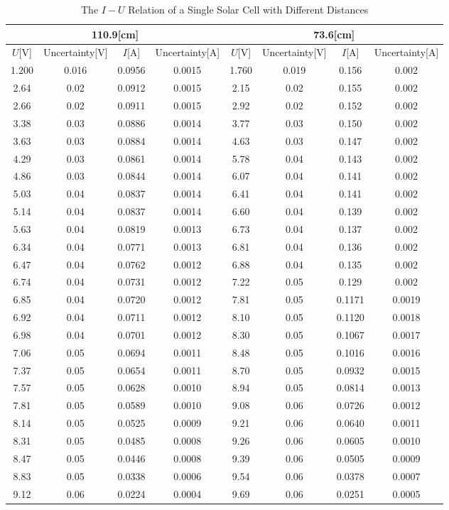 \documentclass[a4paper]{article}
\begin{document}
    \begin{table}[H]
        \centering
        \begin{tabular}{|c|c|c|c||c|c|c|c|}
            \hline
            \multicolumn{4}{|c||}{110.9[cm]}&\multicolumn{4}{c|}{73.6[cm]}\\\hline
            $U$[V]&Uncertainty[V]&$I$[A]&Uncertainty[A]&$U$[V]&Uncertainty[V]&$I$[A]&Uncertainty[A]\\\hline
            1.200&0.016&0.0956&0.0015&1.760&0.019&0.156&0.002\\\hline
            2.64&0.02&0.0912&0.0015&2.15&0.02&0.155&0.002\\\hline
            2.66&0.02&0.0911&0.0015&2.92&0.02&0.152&0.002\\\hline
            3.38&0.03&0.0886&0.0014&3.77&0.03&0.150&0.002\\\hline
            3.63&0.03&0.0884&0.0014&4.63&0.03&0.147&0.002\\\hline
            4.29&0.03&0.0861&0.0014&5.78&0.04&0.143&0.002\\\hline
            4.86&0.03&0.0844&0.0014&6.07&0.04&0.141&0.002\\\hline
            5.03&0.04&0.0837&0.0014&6.41&0.04&0.141&0.002\\\hline
            5.14&0.04&0.0837&0.0014&6.60&0.04&0.139&0.002\\\hline
            5.63&0.04&0.0819&0.0013&6.73&0.04&0.137&0.002\\\hline
            6.34&0.04&0.0771&0.0013&6.81&0.04&0.136&0.002\\\hline
            6.47&0.04&0.0762&0.0012&6.88&0.04&0.135&0.002\\\hline
            6.74&0.04&0.0731&0.0012&7.22&0.05&0.129&0.002\\\hline
            6.85&0.04&0.0720&0.0012&7.81&0.05&0.1171&0.0019\\\hline
            6.92&0.04&0.0711&0.0012&8.10&0.05&0.1120&0.0018\\\hline
            6.98&0.04&0.0701&0.0012&8.30&0.05&0.1067&0.0017\\\hline
            7.06&0.05&0.0694&0.0011&8.48&0.05&0.1016&0.0016\\\hline
            7.37&0.05&0.0654&0.0011&8.70&0.05&0.0932&0.0015\\\hline
            7.57&0.05&0.0628&0.0010&8.94&0.05&0.0814&0.0013\\\hline
            7.81&0.05&0.0589&0.0010&9.08&0.06&0.0726&0.0012\\\hline
            8.14&0.05&0.0525&0.0009&9.21&0.06&0.0640&0.0011\\\hline
            8.31&0.05&0.0485&0.0008&9.26&0.06&0.0605&0.0010\\\hline
            8.47&0.05&0.0446&0.0008&9.39&0.06&0.0505&0.0009\\\hline
            8.83&0.05&0.0338&0.0006&9.54&0.06&0.0378&0.0007\\\hline
            9.12&0.06&0.0224&0.0004&9.69&0.06&0.0251&0.0005\\\hline
        \end{tabular}
        \caption{The $I-U$ Relation of a Single Solar Cell with Different Distances}
        \label{tab:IVsingle}
    \end{table}
\end{document}
